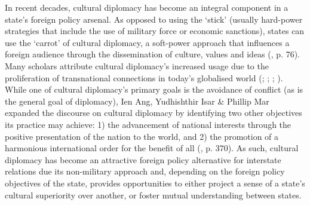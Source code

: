 In recent decades, cultural diplomacy has become an integral component in a state’s foreign policy arsenal. As opposed to using the ‘stick’ (usually hard-power strategies that include the use of military force or economic sanctions), states can use the ‘carrot’ of cultural diplomacy, a soft-power approach that influences a foreign audience through the dissemination of culture, values and ideas (\cite{lenczowski2009}, p. 76). Many scholars attribute cultural diplomacy’s increased usage due to the proliferation of transnational connections in today’s globalised world (\cite{snow2008}; \cite{ang2015}; \cite{chitty2016}; \cite{hartig2016}). While one of cultural diplomacy’s primary goals is the avoidance of conflict (as is the general goal of diplomacy), Ien Ang, Yudhishthir Isar \& Phillip Mar expanded the discourse on cultural diplomacy by identifying two other objectives its practice may achieve:  1) the advancement of national interests through the positive presentation of the nation to the world, and 2) the promotion of a harmonious international order for the benefit of all (\citeyear{ang2015}, p. 370). As such, cultural diplomacy has become an attractive foreign policy alternative for interstate relations due its non-military approach and, depending on the foreign policy objectives of the state, provides opportunities to either project a sense of a state’s cultural superiority over another, or foster mutual understanding between states.

